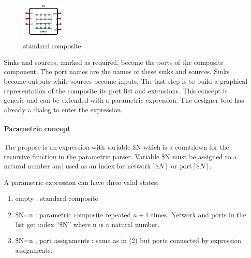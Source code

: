 \begin{figure}
  \vspace{-20pt}
  \begin{center}
    \includegraphics[width=0.20\textwidth]{pictures/composite-boxed}
  \end{center}
  \vspace{-20pt}
  \label{fig:composite-boxed}
  \caption{standard composite}
  \vspace{-10pt}
\end{figure}

Sinks and sources, marked as required, become the ports of the composite
component. The port names are the names of these sinks and sources. Sinks become
outputs while sources become inputs. The last step is to build a graphical
representation of the composite its port list and extensions. This concept is
generic and can be extended with a parametric expression. The designer tool has
already a dialog to enter the expression.

\paragraph{Parametric concept}
The propose is an expression with variable \$N which is a countdown for the
recursive function in the parametric parser. Variable \$N must be assigned to a
natural number and used as an index for network$[\$N]$ or port$[\$N]$.

A parametric expression can have three valid states:

\begin{enumerate}
\item empty : standard composite
\item \$N=n : parametric composite repeated $n+1$ times. Network and ports in
the list get index ``\$N'' where n is a natural number.
\item \$N=n , port assignments : same as in (2) but ports connected by
expression assignments.
\end{enumerate}

